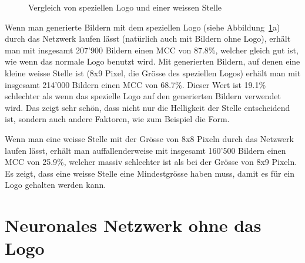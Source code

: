 \documentclass[12pt,a4paper]{report}
\begin{document}
\begin{figure}[h]%
    \centering
    \qquad
    \caption{Vergleich von speziellen Logo und einer weissen Stelle}
    \label{fig:white_square}%
\end{figure}

Wenn man generierte Bildern mit dem speziellen Logo (siehe Abbildung~\ref{fig:white_square}a) durch das Netzwerk laufen lässt (natürlich auch mit Bildern ohne Logo),
erhält man mit insgesamt 207'900 Bildern einen MCC von 87.8\%,
welcher gleich gut ist, wie wenn das normale Logo benutzt wird.
Mit generierten Bildern, auf denen eine kleine weisse Stelle ist (8x9 Pixel, die Grösse des speziellen Logos)
erhält man mit insgesamt 214'000 Bildern einen MCC von 68.7\%.
Dieser Wert ist 19.1\% schlechter als wenn das spezielle Logo auf den generierten Bildern verwendet wird.
Das zeigt sehr schön, dass nicht nur die Helligkeit der Stelle entscheidend ist, sondern auch andere Faktoren, wie zum Beispiel die Form.

Wenn man eine weisse Stelle mit der Grösse von 8x8 Pixeln durch das Netzwerk laufen lässt,
erhält man auffallenderweise mit insgesamt 160'500 Bildern einen MCC von 25.9\%,
welcher massiv schlechter ist als bei der Grösse von 8x9 Pixeln.
Es zeigt, dass eine weisse Stelle eine Mindestgrösse haben muss, damit es für ein Logo gehalten werden kann.

\section{Neuronales Netzwerk ohne das Logo}
\end{document}
